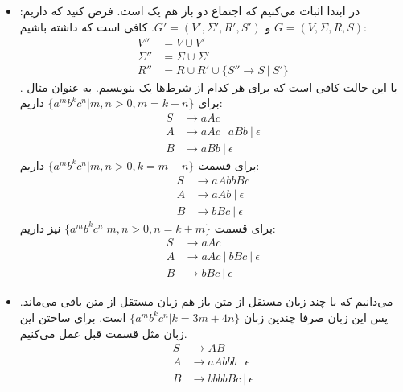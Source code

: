 \subsection{}
\begin{itemize}
    \item در ابتدا اثبات می‌کنیم که اجتماع دو
    باز هم یک
    است. فرض کنید که داریم:
    $G = (V, \Sigma, R, S)$ و $G' = (V', \Sigma', R', S')$.
    کافی است که داشته باشیم:
    \begin{align*}
        V'' &= V \cup V'\\
        \Sigma'' &= \Sigma \cup \Sigma'\\
        R'' &= R \cup R' \cup \{S'' \rightarrow S ~|~ S'\}
    \end{align*}.
    با این حالت کافی است که برای هر کدام از شرط‌ها یک
    بنویسیم. به عنوان مثال برای
    $\{a^mb^kc^n | m,n > 0, m = k + n\}$
    داریم:
    \begin{align*}
        S &\rightarrow aAc\\
        A &\rightarrow aAc ~|~ aBb ~|~ \epsilon\\
        B &\rightarrow aBb ~|~ \epsilon
    \end{align*}
    برای قسمت
    $\{a^mb^kc^n | m,n > 0, k = m + n\}$
    داریم:
    \begin{align*}
        S &\rightarrow aAbbBc\\
        A &\rightarrow aAb ~|~ \epsilon\\
        B &\rightarrow bBc ~|~ \epsilon
    \end{align*}
    برای قسمت
    $\{a^mb^kc^n | m,n > 0, n = k + m\}$
    نیز داریم:
    \begin{align*}
        S &\rightarrow aAc\\
        A &\rightarrow aAc ~|~ bBc ~|~ \epsilon\\
        B &\rightarrow bBc ~|~ \epsilon
    \end{align*}
    \item می‌دانیم که با  چند زبان مستقل از متن باز هم زبان مستقل از متن باقی می‌ماند.
    پس این زبان صرفا
    چندین زبان
    $\{a^mb^kc^n | k = 3m + 4n\}$
    است. برای ساختن این زبان مثل قسمت قبل عمل می‌کنیم.
    \begin{align*}
        S &\rightarrow AB\\
        A &\rightarrow aAbbb ~|~ \epsilon\\
        B &\rightarrow bbbbBc ~|~ \epsilon
    \end{align*}
\end{itemize}
